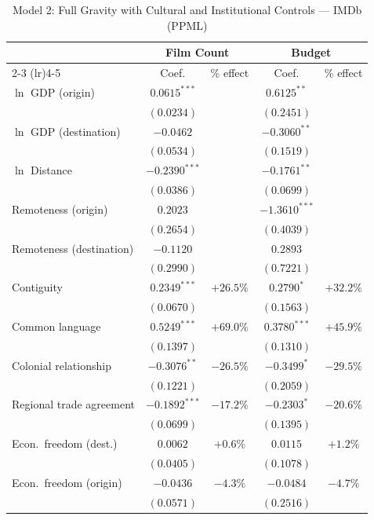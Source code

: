 \clearpage


\begin{table}[htbp]
\centering
\caption{Model 2: Full Gravity with Cultural and Institutional Controls --- IMDb (PPML)}
\label{tab:model2}
\small
\begin{tabular}{l cc cc}
\toprule
 & \multicolumn{2}{c}{Film Count} & \multicolumn{2}{c}{Budget} \\
\cmidrule(lr){2-3} \cmidrule(lr){4-5}
 & Coef. & \% effect & Coef. & \% effect \\
\midrule
$\ln$ GDP (origin) & $0.0615^{***}$ & & $0.6125^{**}$ & \\
 & $(0.0234)$ & & $(0.2451)$ & \\[4pt]
$\ln$ GDP (destination) & $-0.0462$ & & $-0.3060^{**}$ & \\
 & $(0.0534)$ & & $(0.1519)$ & \\[4pt]
$\ln$ Distance & $-0.2390^{***}$ & & $-0.1761^{**}$ & \\
 & $(0.0386)$ & & $(0.0699)$ & \\[4pt]
Remoteness (origin) & $0.2023$ & & $-1.3610^{***}$ & \\
 & $(0.2654)$ & & $(0.4039)$ & \\[4pt]
Remoteness (destination) & $-0.1120$ & & $0.2893$ & \\
 & $(0.2990)$ & & $(0.7221)$ & \\[4pt]
Contiguity & $0.2349^{***}$ & $+26.5\%$ & $0.2790^{*}$ & $+32.2\%$ \\
 & $(0.0670)$ & & $(0.1563)$ & \\[4pt]
Common language & $0.5249^{***}$ & $+69.0\%$ & $0.3780^{***}$ & $+45.9\%$ \\
 & $(0.1397)$ & & $(0.1310)$ & \\[4pt]
Colonial relationship & $-0.3076^{**}$ & $-26.5\%$ & $-0.3499^{*}$ & $-29.5\%$ \\
 & $(0.1221)$ & & $(0.2059)$ & \\[4pt]
Regional trade agreement & $-0.1892^{***}$ & $-17.2\%$ & $-0.2303^{*}$ & $-20.6\%$ \\
 & $(0.0699)$ & & $(0.1395)$ & \\[4pt]
Econ.\ freedom (dest.) & $0.0062$ & $+0.6\%$ & $0.0115$ & $+1.2\%$ \\
 & $(0.0405)$ & & $(0.1078)$ & \\[4pt]
Econ.\ freedom (origin) & $-0.0436$ & $-4.3\%$ & $-0.0484$ & $-4.7\%$ \\
 & $(0.0571)$ & & $(0.2516)$ & \\[4pt]

\end{tabular}
\end{table}
